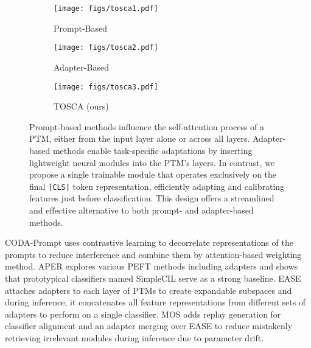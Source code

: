 \begin{figure}[t]
\captionsetup{font=small}
  \centering
  \begin{subfigure}{0.463\textwidth}
    \texttt{[image: figs/tosca1.pdf]}
    \caption{Prompt-Based}
    \label{fig:params}
  \end{subfigure}
  \hfill
  \begin{subfigure}{0.23\textwidth}
    \texttt{[image: figs/tosca2.pdf]}
    \caption{Adapter-Based}
    \label{fig:abla_heat}
  \end{subfigure}
  \hfill
  \begin{subfigure}{0.2\textwidth}
    \texttt{[image: figs/tosca3.pdf]}
    \caption{TOSCA (ours)}
    \label{fig:abla_line}
  \end{subfigure}
\caption{Prompt-based methods influence the self-attention process of a PTM, either from the input layer alone or across all layers. Adapter-based methods enable task-specific adaptations by inserting lightweight neural modules into the PTM’s layers. In contrast, we propose a single trainable module that operates exclusively on the final \texttt{[CLS]} token representation, efficiently adapting and calibrating features just before classification. This design offers a streamlined and effective alternative to both prompt- and adapter-based methods.}
\end{figure}

CODA-Prompt \cite{codaprompt} uses contrastive learning to decorrelate representations of the prompts to reduce interference and combine them by attention-based weighting method.
APER \cite{simplecil_aper} explores various PEFT methods including adapters and shows that prototypical classifiers named SimpleCIL serve as a strong baseline. 
EASE \cite{ease} attaches adapters to each layer of PTMs to create expandable subspaces and during inference, it concatenates all feature representations from different sets of adapters to perform on a single classifier. 
MOS \cite{mos} adds replay generation for classifier alignment and an adapter merging over EASE to reduce mistakenly retrieving irrelevant modules during inference due to parameter drift.